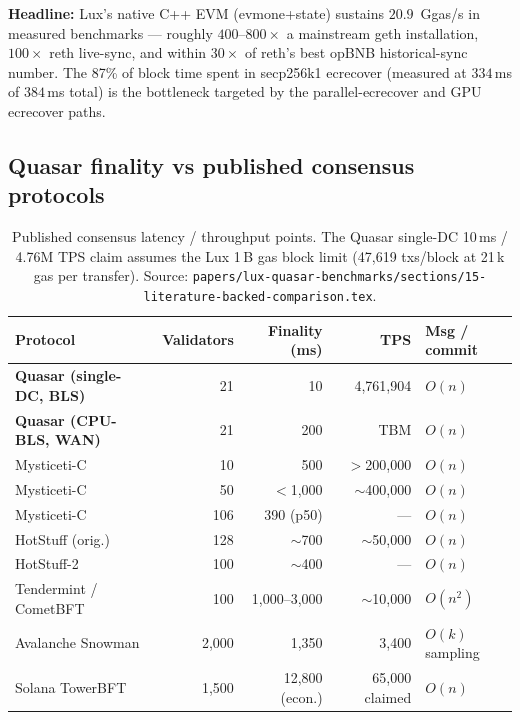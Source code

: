 \noindent\textbf{Headline:} Lux's native C++ EVM (evmone+state) sustains
$20.9$~Ggas/s in measured benchmarks --- roughly $400$--$800\times$ a
mainstream geth installation, $100\times$ reth live-sync, and within
$30\times$ of reth's best opBNB historical-sync number. The 87\% of block
time spent in secp256k1 ecrecover (measured at $334$\,ms of $384$\,ms
total) is the bottleneck targeted by the parallel-ecrecover and GPU
ecrecover paths.

\subsection{Quasar finality vs published consensus protocols}

\begin{table}[h]
\centering
\small
\caption{Published consensus latency / throughput points. The Quasar
single-DC 10\,ms / 4.76M TPS claim assumes the Lux 1\,B gas block limit
(47{,}619 txs/block at 21\,k gas per transfer). Source:
\texttt{papers/lux-quasar-benchmarks/sections/15-literature-backed-comparison.tex}.}
\label{tab:consensus-comparison}
\begin{tabular}{lrrrl}
\toprule
\textbf{Protocol} & \textbf{Validators} & \textbf{Finality (ms)}
  & \textbf{TPS} & \textbf{Msg / commit} \\
\midrule
\textbf{Quasar (single-DC, BLS)}  & 21        & 10              & 4{,}761{,}904 & $O(n)$ \\
\textbf{Quasar (CPU-BLS, WAN)}    & 21        & 200             & TBM           & $O(n)$ \\
Mysticeti-C                       & 10        & 500             & $>$200{,}000  & $O(n)$ \\
Mysticeti-C                       & 50        & $<$1{,}000      & $\sim$400{,}000 & $O(n)$ \\
Mysticeti-C                       & 106       & 390 (p50)       & ---           & $O(n)$ \\
HotStuff (orig.)                  & 128       & $\sim$700       & $\sim$50{,}000 & $O(n)$ \\
HotStuff-2                        & 100       & $\sim$400       & ---           & $O(n)$ \\
Tendermint / CometBFT             & 100       & 1{,}000--3{,}000 & $\sim$10{,}000 & $O(n^2)$ \\
Avalanche Snowman                 & 2{,}000   & 1{,}350         & 3{,}400        & $O(k)$ sampling \\
Solana TowerBFT                   & 1{,}500   & 12{,}800 (econ.) & 65{,}000 claimed & $O(n)$ \\
\bottomrule
\end{tabular}
\end{table}

